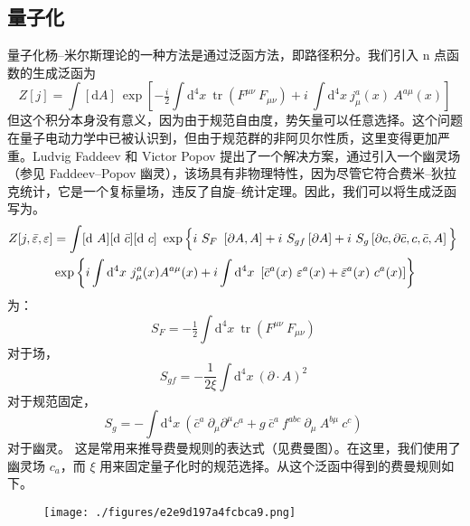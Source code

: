 \subsection{量子化}  
量子化杨–米尔斯理论的一种方法是通过泛函方法，即路径积分。我们引入 n 点函数的生成泛函为
\[\displaystyle \ Z[j]=\int [\mathrm {d} A]\ \exp \left[-{\tfrac {i}{2}}\int \mathrm {d} ^{4}x\ \operatorname {tr} \left(F^{\mu \nu }\ F_{\mu \nu }\right)+i\ \int \mathrm {d} ^{4}x\ j_{\mu }^{a}(x)\ A^{a\mu }(x)\right]~\]
但这个积分本身没有意义，因为由于规范自由度，势矢量可以任意选择。这个问题在量子电动力学中已被认识到，但由于规范群的非阿贝尔性质，这里变得更加严重。Ludvig Faddeev 和 Victor Popov 提出了一个解决方案，通过引入一个幽灵场（参见 Faddeev–Popov 幽灵），该场具有非物理特性，因为尽管它符合费米–狄拉克统计，它是一个复标量场，违反了自旋–统计定理。因此，我们可以将生成泛函写为。
\[\displaystyle {\begin{aligned}Z[j,{\bar {\varepsilon }},\varepsilon ]&=\int [\mathrm {d} \ A][\mathrm {d} \ {\bar {c}}][\mathrm {d} \ c]\ \exp {\Bigl \{}i\ S_{F}\ \left[\partial A,A\right]+i\ S_{gf}\left[\partial A\right]+i\ S_{g}\left[\partial c,\partial {\bar {c}},c,{\bar {c}},A\right]{\Bigr \}}\\&\exp \left\{i\int \mathrm {d} ^{4}x\ j_{\mu }^{a}(x)A^{a\mu }(x)+i\int \mathrm {d} ^{4}x\ \left[{\bar {c}}^{a}(x)\ \varepsilon ^{a}(x)+{\bar {\varepsilon }}^{a}(x)\ c^{a}(x)\right]\right\}\end{aligned}}~\]
为：
\[\displaystyle S_{F}=-{\tfrac {1}{2}}\int \mathrm {d} ^{4}x\ \operatorname {tr} \left(F^{\mu \nu }\ F_{\mu \nu }\right)~\] 
对于场，  
\[\displaystyle S_{gf}=-{\frac {1}{2\xi }}\int \mathrm {d} ^{4}x\ (\partial \cdot A)^{2}~\] 
对于规范固定，
\[\displaystyle S_{g}=-\int \mathrm {d} ^{4}x\ \left({\bar {c}}^{a}\ \partial _{\mu }\partial ^{\mu }c^{a}+g\ {\bar {c}}^{a}\ f^{abc}\ \partial _{\mu }\ A^{b\mu }\ c^{c}\right)~\] 
对于幽灵。  
这是常用来推导费曼规则的表达式（见费曼图）。在这里，我们使用了幽灵场 \(c_a\)，而 \(\xi\) 用来固定量子化时的规范选择。从这个泛函中得到的费曼规则如下。
\begin{figure}[ht]
\centering
\texttt{[image: ./figures/e2e9d197a4fcbca9.png]}
\caption{} \label{fig_Yang_3}
\end{figure}

